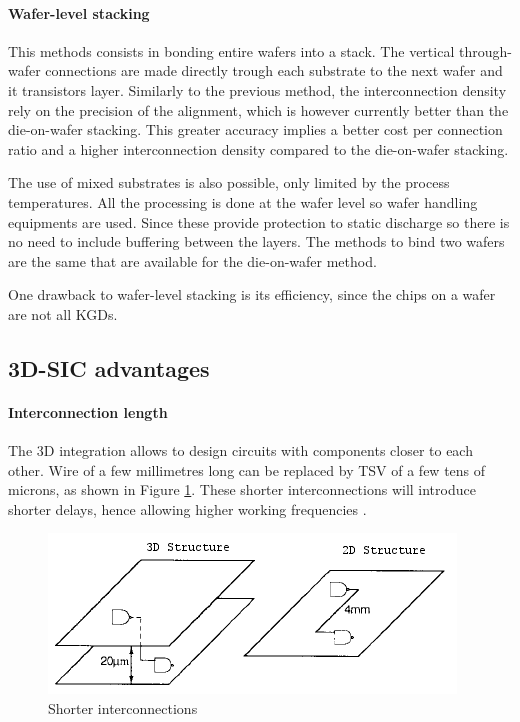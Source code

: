 \paragraph{Wafer-level stacking}

This methods consists in bonding entire wafers into a stack. The vertical through-wafer connections are made directly trough each substrate to the next wafer and it transistors layer. Similarly to the previous method, the interconnection density rely on the precision of the alignment, which is however currently better than the die-on-wafer stacking. This greater accuracy implies a better cost per connection ratio and a higher interconnection density compared to the die-on-wafer stacking.

The use of mixed substrates is also possible, only limited by the process temperatures. All the processing is done at the wafer level so wafer handling equipments are used. Since these provide protection to static discharge so there is no need to include buffering between the layers. The methods to bind two wafers are the same that are available for the die-on-wafer method.

One drawback to wafer-level stacking is its efficiency, since the chips on a wafer are not all KGDs.

\subsection{3D-SIC advantages}

\paragraph{Interconnection length}

The 3D integration allows to design circuits with components closer to each other. Wire of a few millimetres long can be replaced by TSV of a few tens of microns, as shown in Figure \ref{fig:wire}. These shorter interconnections will introduce shorter delays, hence allowing higher working frequencies \cite{659500,981091}.

\begin{figure}[h!]
\begin{center}
\includegraphics[width=0.75\linewidth]{wire.png}
\end{center}
\vspace{-0.5cm}
\caption{Shorter interconnections \cite{659500}}
\label{fig:wire}
\end{figure}

